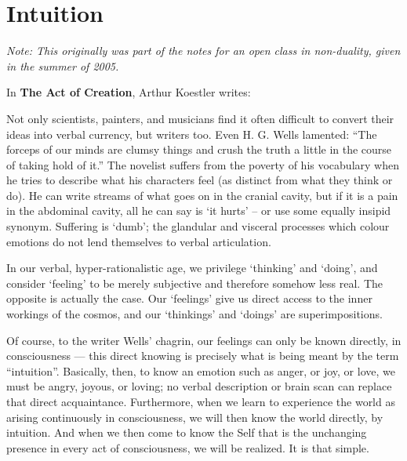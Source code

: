 \section{Intuition}

\emph{Note: This originally was part of the notes for an open class in non-duality, given in the summer of 2005.}

In \textbf{The Act of Creation}, Arthur Koestler writes:

\begin{quotex}
Not only scientists, painters, and musicians find it often difficult to convert their ideas into verbal currency, but writers too. Even H. G. Wells lamented: ``The forceps of our minds are clumsy things and crush the truth a little in the course of taking hold of it.'' The novelist suffers from the poverty of his vocabulary when he tries to describe what his characters feel (as distinct from what they think or do). He can write streams of what goes on in the cranial cavity, but if it is a pain in the abdominal cavity, all he can say is `it hurts' -- or use some equally insipid synonym. Suffering is `dumb'; the glandular and visceral processes which colour emotions do not lend themselves to verbal articulation.
\end{quotex}


In our verbal, hyper-rationalistic age, we privilege `thinking' and `doing', and consider `feeling' to be merely subjective and therefore somehow less real. The opposite is actually the case. Our `feelings' give us direct access to the inner workings of the cosmos, and our `thinkings' and `doings' are superimpositions.

Of course, to the writer Wells' chagrin, our feelings can only be known directly, in consciousness --- this direct knowing is precisely what is being meant by the term ``intuition''. Basically, then, to know an emotion such as anger, or joy, or love, we must be angry, joyous, or loving; no verbal description or brain scan can replace that direct acquaintance. Furthermore, when we learn to experience the world as arising continuously in consciousness, we will then know the world directly, by intuition. And when we then come to know the Self that is the unchanging presence in every act of consciousness, we will be realized. It is that simple.



